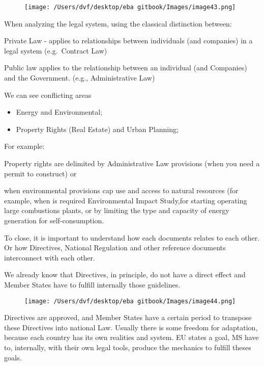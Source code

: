 \documentclass[]{book}
\providecommand{\tightlist}{%
  \setlength{\itemsep}{0pt}\setlength{\parskip}{0pt}}
\theoremstyle{definition}
\theoremstyle{definition}
\theoremstyle{definition}
\theoremstyle{remark}
\begin{document}
\begin{figure}[htbp]
\centering
\texttt{[image: /Users/dvf/desktop/eba gitbook/Images/image43.png]}
\caption{}
\end{figure}

When analyzing the legal system, using the classical distinction
between:

Private Law - applies to relationships between individuals (and
companies) in a legal system (e.g.~Contract Law)

Public law applies to the relationship between an individual (and
Companies) and the Government. (e.g., Administrative Law)

We can see conflicting areas

\begin{itemize}
\tightlist
\item
  Energy and Environmental;
\item
  Property Rights (Real Estate) and Urban Planning;
\end{itemize}

For example:

Property rights are delimited by Administrative Law provisions (when you
need a permit to construct) or

when environmental provisions cap use and access to natural resources
(for example, when is required Environmental Impact Study,for starting
operating large combustions plants, or by limiting the type and capacity
of energy generation for self-consumption.

To close, it is important to understand how each documents relates to
each other. Or how Directives, National Regulation and other reference
documents interconnect with each other.

We already know that Directives, in principle, do not have a direct
effect and Member States have to fulfill internally those guidelines.

\begin{figure}[htbp]
\centering
\texttt{[image: /Users/dvf/desktop/eba gitbook/Images/image44.png]}
\caption{}
\end{figure}

Directives are approved, and Member States have a certain period to
transpose these Directives into national Law. Usually there is some
freedom for adaptation, because each country has its own realities and
system. EU states a goal, MS have to, internally, with their own legal
tools, produce the mechanics to fulfill theses goals.
\end{document}
